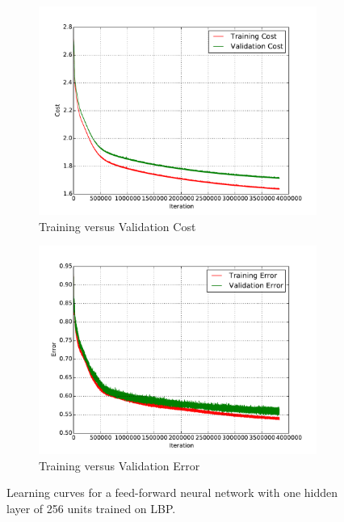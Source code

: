 \begin{figure}
	\centering
	\begin{subfigure}[b]{0.45\linewidth}
		\centering
		\includegraphics[width=\linewidth]{images/1/train_val_cost.pdf}
		\caption{Training versus Validation Cost}
	\end{subfigure}
	\hfill
	\begin{subfigure}[b]{0.45\linewidth}
		\centering
		\includegraphics[width=\linewidth]{images/1/train_val_error.pdf}
		\caption{Training versus Validation Error}
	\end{subfigure}
	\caption{Learning curves for a feed-forward neural network with one hidden layer of 256 units trained on LBP.}
	\label{shrine1_curves}
\end{figure}
